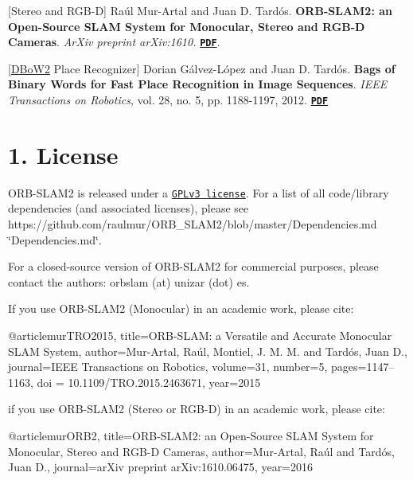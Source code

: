 \mbox{[}Stereo and R\+G\+B-\/D\mbox{]} Raúl Mur-\/\+Artal and Juan D. Tardós. {\bfseries O\+R\+B-\/\+S\+L\+A\+M2\+: an Open-\/\+Source S\+L\+AM System for Monocular, Stereo and R\+G\+B-\/D Cameras}. {\itshape Ar\+Xiv preprint ar\+Xiv\+:1610.} {\bfseries \href{https://128.84.21.199/pdf/1610.06475.pdf}{\tt P\+DF}}.

\mbox{[}\mbox{\hyperlink{namespace_d_bo_w2}{D\+Bo\+W2}} Place Recognizer\mbox{]} Dorian Gálvez-\/\+López and Juan D. Tardós. {\bfseries Bags of Binary Words for Fast Place Recognition in Image Sequences}. {\itshape I\+E\+EE Transactions on Robotics,} vol. 28, no. 5, pp. 1188-\/1197, 2012. {\bfseries \href{http://doriangalvez.com/php/dl.php?dlp=GalvezTRO12.pdf}{\tt P\+DF}}

\section*{1. License}

O\+R\+B-\/\+S\+L\+A\+M2 is released under a \href{https://github.com/raulmur/ORB_SLAM2/blob/master/License-gpl.txt}{\tt G\+P\+Lv3 license}. For a list of all code/library dependencies (and associated licenses), please see https\+://github.com/raulmur/\+O\+R\+B\+\_\+\+S\+L\+A\+M2/blob/master/\+Dependencies.\+md \char`\"{}\+Dependencies.\+md\char`\"{}.

For a closed-\/source version of O\+R\+B-\/\+S\+L\+A\+M2 for commercial purposes, please contact the authors\+: orbslam (at) unizar (dot) es.

If you use O\+R\+B-\/\+S\+L\+A\+M2 (Monocular) in an academic work, please cite\+: \begin{DoxyVerb}@article{murTRO2015,
  title={{ORB-SLAM}: a Versatile and Accurate Monocular {SLAM} System},
  author={Mur-Artal, Ra\'ul, Montiel, J. M. M. and Tard\'os, Juan D.},
  journal={IEEE Transactions on Robotics},
  volume={31},
  number={5},
  pages={1147--1163},
  doi = {10.1109/TRO.2015.2463671},
  year={2015}
 }
\end{DoxyVerb}


if you use O\+R\+B-\/\+S\+L\+A\+M2 (Stereo or R\+G\+B-\/D) in an academic work, please cite\+: \begin{DoxyVerb}@article{murORB2,
  title={{ORB-SLAM2}: an Open-Source {SLAM} System for Monocular, Stereo and {RGB-D} Cameras},
  author={Mur-Artal, Ra\'ul and Tard\'os, Juan D.},
  journal={arXiv preprint arXiv:1610.06475},
  year={2016}
 }
\end{DoxyVerb}


